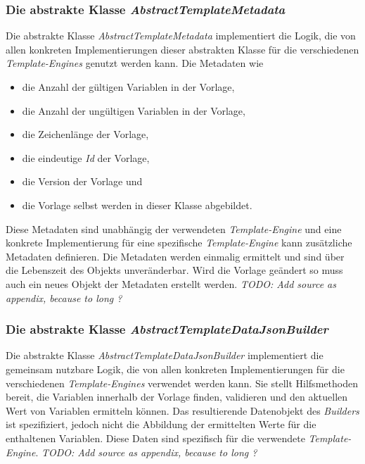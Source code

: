\subsubsection{Die abstrakte Klasse \emph{AbstractTemplateMetadata}}
\label{sec:abstractTemplateMetadata}
Die abstrakte Klasse \emph{AbstractTemplateMetadata} implementiert die Logik, die von allen konkreten Implementierungen dieser abstrakten Klasse für die verschiedenen \emph{Template-Engines} genutzt werden kann. Die Metadaten wie
\begin{itemize}
	\item die Anzahl der gültigen Variablen in der Vorlage,
	\item die Anzahl der ungültigen Variablen in der Vorlage,
	\item die Zeichenlänge der Vorlage,
	\item die eindeutige \emph{Id} der Vorlage,
	\item die Version der Vorlage und
	\item die Vorlage selbst werden in dieser Klasse abgebildet. 
\end{itemize}
Diese Metadaten sind unabhängig der verwendeten \emph{Template-Engine} und eine konkrete Implementierung für eine spezifische \emph{Template-Engine} kann zusätzliche Metadaten definieren. Die Metadaten werden einmalig ermittelt und sind über die Lebenszeit des Objekts unveränderbar. Wird die Vorlage geändert so muss auch ein neues Objekt der Metadaten erstellt werden.
\newline
\newline
\emph{TODO: Add source as appendix, because to long ?}

\subsubsection{Die abstrakte Klasse \emph{AbstractTemplateDataJsonBuilder}}
\label{sec:abstractTemplateDataJsonBuilder}
Die abstrakte Klasse \emph{AbstractTemplateDataJsonBuilder} implementiert die gemeinsam nutzbare Logik, die von allen konkreten Implementierungen für die verschiedenen \emph{Template-Engines} verwendet werden kann. Sie stellt Hilfsmethoden bereit, die Variablen innerhalb der Vorlage finden, validieren und den aktuellen Wert von Variablen ermitteln können. Das resultierende Datenobjekt des \emph{Builders} ist spezifiziert, jedoch nicht die Abbildung der ermittelten Werte für die enthaltenen Variablen. Diese Daten sind spezifisch für die verwendete \emph{Template-Engine}.
\newline 
\newline  
\emph{TODO: Add source as appendix, because to long ?}


